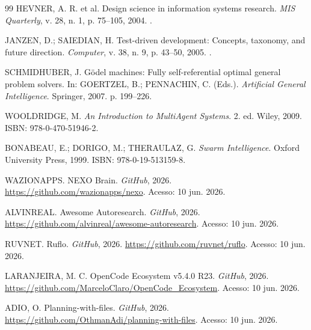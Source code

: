 \begin{thebibliography}{99}
HEVNER, A. R. et al. Design science in information systems research. \textit{MIS Quarterly}, v. 28, n. 1, p. 75--105, 2004. .

JANZEN, D.; SAIEDIAN, H. Test-driven development: Concepts, taxonomy, and future direction. \textit{Computer}, v. 38, n. 9, p. 43--50, 2005. .

SCHMIDHUBER, J. Gödel machines: Fully self-referential optimal general problem solvers. In: GOERTZEL, B.; PENNACHIN, C. (Eds.). \textit{Artificial General Intelligence}. Springer, 2007. p. 199--226.

WOOLDRIDGE, M. \textit{An Introduction to MultiAgent Systems}. 2. ed. Wiley, 2009. ISBN: 978-0-470-51946-2.

BONABEAU, E.; DORIGO, M.; THERAULAZ, G. \textit{Swarm Intelligence}. Oxford University Press, 1999. ISBN: 978-0-19-513159-8.

WAZIONAPPS. NEXO Brain. \textit{GitHub}, 2026. \url{https://github.com/wazionapps/nexo}. Acesso: 10 jun. 2026.

ALVINREAL. Awesome Autoresearch. \textit{GitHub}, 2026. \url{https://github.com/alvinreal/awesome-autoresearch}. Acesso: 10 jun. 2026.

RUVNET. Ruflo. \textit{GitHub}, 2026. \url{https://github.com/ruvnet/ruflo}. Acesso: 10 jun. 2026.

LARANJEIRA, M. C. OpenCode Ecosystem v5.4.0 R23. \textit{GitHub}, 2026. \url{https://github.com/MarceloClaro/OpenCode_Ecosystem}. Acesso: 10 jun. 2026.

ADIO, O. Planning-with-files. \textit{GitHub}, 2026. \url{https://github.com/OthmanAdi/planning-with-files}. Acesso: 10 jun. 2026.

\end{thebibliography}
